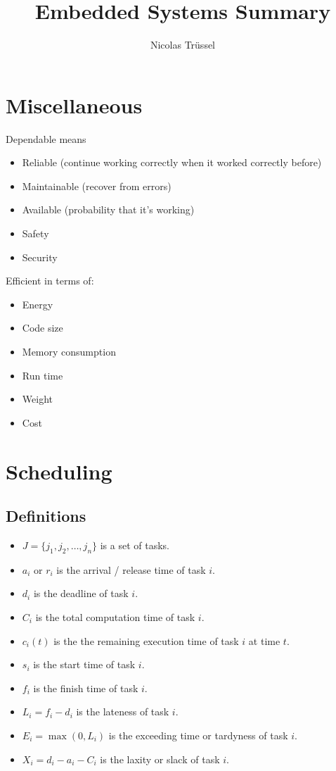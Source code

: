 \documentclass[a4paper,titlepage]{article}
\author{Nicolas Trüssel}
\title{Embedded Systems Summary}
\newcommand{\set}[1]{\lbrace #1 \rbrace}
\begin{document}
\maketitle

\section{Miscellaneous}
Dependable means
\begin{itemize}
	\item Reliable (continue working correctly when it worked correctly before)
	\item Maintainable (recover from errors)
	\item Available	(probability that it's working)
	\item Safety
	\item Security
\end{itemize}

Efficient in terms of:
\begin{itemize}
	\item Energy
	\item Code size
	\item Memory consumption
	\item Run time
	\item Weight
	\item Cost
\end{itemize}

\section{Scheduling}

\subsection{Definitions}
\begin{itemize}
	\item $J = \set{j_1, j_2, \dots, j_n}$ is a set of tasks.
	\item $a_i$ or $r_i$ is the arrival / release time of task $i$.
	\item $d_i$ is the deadline of task $i$.
	\item $C_i$ is the total computation time of task $i$.
	\item $c_i(t)$ is the the remaining execution time of task $i$ at time $t$.
	\item $s_i$ is the start time of task $i$.
	\item $f_i$ is the finish time of task $i$.
	\item $L_i = f_i - d_i$ is the lateness of task $i$.
	\item $E_i = \max\left(0, L_i\right)$ is the exceeding time or tardyness of task $i$.
	\item $X_i = d_i - a_i - C_i$ is the laxity or slack of task $i$.
\end{itemize}
\end{document}
